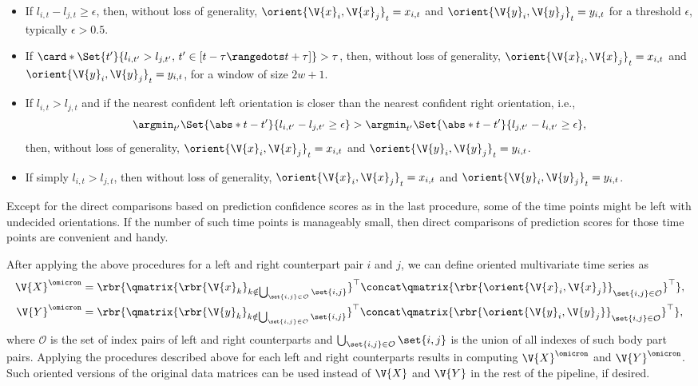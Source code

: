 \begin{itemize}
	\item If $l_{i,t} - l_{j,t} \geq  \epsilon$, then, without loss of generality, $\orient{\V{x}_i, \V{x}_j}_t=x_{i,t}$ and $\orient{\V{y}_i, \V{y}_j}_t=y_{i,t}$ for a threshold $\epsilon$, typically $\epsilon > 0.5$.

	\item If $\card*{\Set{t^{\prime}}{l_{i,t^{\prime}} > l_{j,t^{\prime}}, \, t^{\prime} \in [t-\tau \rangedots t+\tau]}} > \tau$, then, without loss of generality, $\orient{\V{x}_i, \V{x}_j}_t=x_{i,t}$ and $\orient{\V{y}_i, \V{y}_j}_t=y_{i,t}$, for a window of size $2w+1$.

	\item If $l_{i,t} > l_{j,t}$ and if the nearest confident left orientation is closer than the nearest confident right orientation, i.e., $$\argmin_{t^{\prime}} \Set{\abs*{t-t^{\prime}}}{l_{i,t^{\prime}} - l_{j,t^{\prime}} \geq \epsilon} > \argmin_{t^{\prime}} \Set{\abs*{t - t^{\prime}}}{l_{j,t^{\prime}} - l_{i,t^{\prime}} \geq \epsilon},$$ then, without loss of generality, $\orient{\V{x}_i, \V{x}_j}_t=x_{i,t}$ and $\orient{\V{y}_i, \V{y}_j}_t=y_{i,t}$.
	\item If simply $l_{i,t} > l_{j,t}$, then without loss of generality, $\orient{\V{x}_i, \V{x}_j}_t=x_{i,t}$ and $\orient{\V{y}_i, \V{y}_j}_t=y_{i,t}$.
\end{itemize}

Except for the direct comparisons based on prediction confidence scores as in the last procedure, some of the time points might be left with undecided orientations.
If the number of such time points is manageably small, then direct comparisons of prediction scores for those time points are convenient and handy.


After applying the above procedures for a left and right counterpart pair $i$ and $j$, we can define oriented multivariate time series as
\begin{equation}
	\begin{aligned}
		\V{X}^{\omicron} & = \rbr{\qmatrix{\rbr{\V{x}_k}_{k \notin \bigcup_{\set{i,j} \in \mathcal{O}} \set{i,j}}}^\top \concat \qmatrix{\rbr{\orient{\V{x}_i, \V{x}_j}}_{\set{i,j} \in \mathcal{O}}}^\top}, \\
		\V{Y}^{\omicron} & = \rbr{\qmatrix{\rbr{\V{y}_k}_{k \notin \bigcup_{\set{i,j} \in \mathcal{O}} \set{i,j}}}^\top \concat \qmatrix{\rbr{\orient{\V{y}_i, \V{y}_j}}_{\set{i,j} \in \mathcal{O}}}^\top},
	\end{aligned}
\end{equation}
where $\mathcal{O}$ is the set of index pairs of left and right counterparts and $\bigcup_{\set{i,j} \in \mathcal{O}} \set{i,j}$ is the union of all indexes of such body part pairs.
Applying the procedures described above for each left and right counterparts results in computing $\V{X}^{\omicron}$ and $\V{Y}^{\omicron}$.
Such oriented versions of the original data matrices can be used instead of $\V{X}$ and $\V{Y}$ in the rest of the pipeline, if desired.

